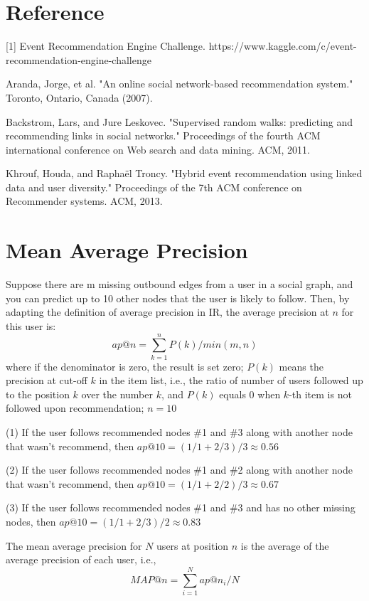 \documentclass{article}
\begin{document}
\section{Reference}
[1] Event Recommendation Engine Challenge.
https://www.kaggle.com/c/event-recommendation-engine-challenge

\noindent[2] Aranda, Jorge, et al. "An online social network-based recommendation system." Toronto, Ontario, Canada (2007).

\noindent[3] Backstrom, Lars, and Jure Leskovec. "Supervised random walks: predicting and recommending links in social networks." Proceedings of the fourth ACM international conference on Web search and data mining. ACM, 2011.

\noindent[4] Khrouf, Houda, and Raphaël Troncy. "Hybrid event recommendation using linked data and user diversity." Proceedings of the 7th ACM conference on Recommender systems. ACM, 2013.

\appendix
\section{Mean Average Precision}
Suppose there are m missing outbound edges from a user in a social graph, and you can predict up to 10 other nodes that the user is likely to follow. Then, by adapting the definition of average precision in IR, the average precision at $n$ for this user is:
\begin{equation}
ap@n=\sum_{k=1}^n P(k)/min(m,n)
\end{equation}
where if the denominator is zero, the result is set zero; $P(k)$ means the precision at cut-off $k$ in the item list, i.e., the ratio of number of users followed up to the position $k$ over the number $k$, and $P(k)$ equals 0 when $k$-th item is not followed upon recommendation; $n = 10$

(1) If the user follows recommended nodes \#1 and \#3 along with another node that wasn't recommend, then $ap@10 = (1/1 + 2/3)/3 ≈ 0.56$

(2) If the user follows recommended nodes \#1 and \#2 along with another node that wasn't recommend, then $ap@10 = (1/1 + 2/2)/3 ≈ 0.67$

(3) If the user follows recommended nodes \#1 and \#3 and has no other missing nodes, then $ap@10 = (1/1 + 2/3)/2 ≈ 0.83$

The mean average precision for $N$ users at position $n$ is the average of the average precision of each user, i.e.,
\begin{equation}
MAP@n=\sum_{i=1}^N ap@n_i /N
\end{equation}
\end{document}
